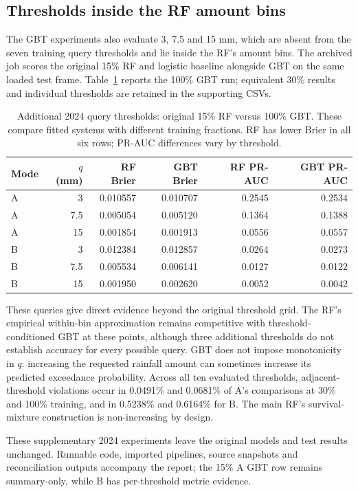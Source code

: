 \subsection{Thresholds inside the RF amount bins}
The GBT experiments also evaluate 3, 7.5 and 15 mm, which are absent from the seven training query thresholds and lie inside the RF's amount bins. The archived job scores the original 15\% RF and logistic baseline alongside GBT on the same loaded test frame. Table~\ref{tab:interior} reports the 100\% GBT run; equivalent 30\% results and individual thresholds are retained in the supporting CSVs.
\begin{table}[!ht]\centering\small
\begin{tabular}{lrrrrr}\toprule
Mode & $q$ (mm) & RF Brier & GBT Brier & RF PR-AUC & GBT PR-AUC\\\midrule
A & 3 & 0.010557 & 0.010707 & 0.2545 & 0.2534 \\
A & 7.5 & 0.005054 & 0.005120 & 0.1364 & 0.1388 \\
A & 15 & 0.001854 & 0.001913 & 0.0556 & 0.0557 \\
B & 3 & 0.012384 & 0.012857 & 0.0264 & 0.0273 \\
B & 7.5 & 0.005534 & 0.006141 & 0.0127 & 0.0122 \\
B & 15 & 0.001950 & 0.002620 & 0.0052 & 0.0042 \\
\bottomrule\end{tabular}
\caption{Additional 2024 query thresholds: original 15\% RF versus 100\% GBT. These compare fitted systems with different training fractions. RF has lower Brier in all six rows; PR-AUC differences vary by threshold.}\label{tab:interior}
\end{table}
\FloatBarrier

These queries give direct evidence beyond the original threshold grid. The RF's empirical within-bin approximation remains competitive with threshold-conditioned GBT at these points, although three additional thresholds do not establish accuracy for every possible query. GBT does not impose monotonicity in $q$: increasing the requested rainfall amount can sometimes increase its predicted exceedance probability. Across all ten evaluated thresholds, adjacent-threshold violations occur in 0.0491\% and 0.0681\% of A's comparisons at 30\% and 100\% training, and in 0.5238\% and 0.6164\% for B. The main RF's survival-mixture construction is non-increasing by design.

These supplementary 2024 experiments leave the original models and test results unchanged. Runnable code, imported pipelines, source snapshots and reconciliation outputs accompany the report; the 15\% A GBT row remains summary-only, while B has per-threshold metric evidence.

\clearpage
